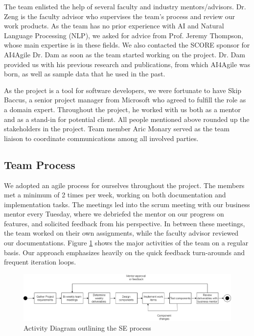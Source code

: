 The team enlisted the help of several faculty and industry mentors/advisors. Dr. Zeng is the faculty advisor who supervises the team's process and review our work products. As the team has no prior experience with AI and Natural Language Processing (NLP), we asked for advice from Prof. Jeremy Thompson, whose main expertise is in these fields. We also contacted the SCORE sponsor for AI4Agile Dr. Dam as soon as the team started working on the project. Dr. Dam provided us with his previous research and publications, from which AI4Agile was born, as well as sample data that he used in the past. 

As the project is a tool for software developers, we were fortunate to have Skip Baccus, a senior project manager from Microsoft who agreed to fulfill the role as a domain expert. Throughout the project, he worked with us both as a mentor and as a stand-in for potential client. All people mentioned above rounded up the stakeholders in the project. Team member Aric Monary served as the team liaison to coordinate communications among all involved parties.

\subsection{Team Process}
We adopted an agile process for ourselves throughout the project. The members met a minimum of 2 times per week, working on both documentation and implementation tasks. The meetings led into the scrum meeting with our business mentor every Tuesday, where we debriefed the mentor on our progress on features, and solicited feedback from his perspective. In between these meetings, the team worked on their own assignments, while the faculty advisor reviewed our documentations. Figure \ref{fig:acd} shows the major activities of the team on a regular basis. Our approach emphasizes heavily on the quick feedback turn-arounds and frequent iteration loops. 

\begin{figure}
\centering
\includegraphics[width=\textwidth,keepaspectratio]{./figure/ActivityDiagram.png}
\caption{Activity Diagram outlining the SE process}
\label{fig:acd}
\end{figure}


